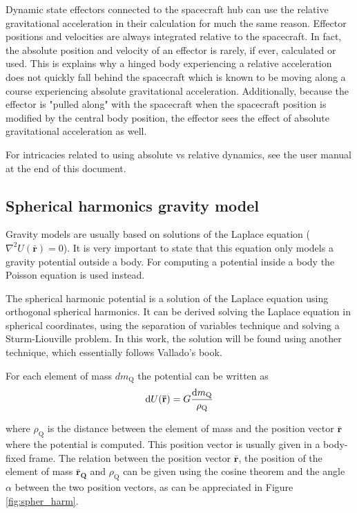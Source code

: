 Dynamic state effectors connected to the spacecraft hub can use the relative gravitational acceleration in their calculation for much the same reason. Effector positions and velocities are always integrated relative to the spacecraft. In fact, the absolute position and velocity of an effector is rarely, if ever, calculated or used. This is explains why a hinged body experiencing a relative acceleration does not quickly fall behind the spacecraft which is known to be moving along a course experiencing absolute gravitational acceleration. Additionally, because the effector is "pulled along" with the spacecraft when the spacecraft position is modified by the central body position, the effector sees the effect of absolute gravitational acceleration as well.

For intricacies related to using absolute vs relative dynamics, see the user manual at the end of this document.

\subsection{Spherical harmonics gravity model}

Gravity models are usually based on solutions of the Laplace equation ($\nabla^2 U(\mathbf{\bar r}) = 0$). It is very important to state that this equation only models a gravity potential outside a body. For computing a potential inside a body the Poisson equation is used instead.

The spherical harmonic potential is a solution of the Laplace equation using orthogonal spherical harmonics. It can be derived solving the Laplace equation in spherical coordinates, using the separation of variables technique and solving a Sturm-Liouville problem. In this work, the solution will be found using another technique, which essentially follows Vallado's book\cite{vallado2013}.

For each element of mass $d m_\text{Q}$ the potential can be written as
\begin{equation}
\D U(\mathbf{\bar r}) = G \frac{\D m_\text{Q}}{\rho_\text{Q}}
\end{equation}

where $\rho_\text{Q}$ is the distance between the element of mass and the position vector $\mathbf{\bar r}$ where the potential is computed. This position vector is usually given in a body-fixed frame. The relation between the position vector $\mathbf{\bar r}$, the position of the element of mass $\mathbf{\bar r_\text{Q}}$ and $\rho_\text{Q}$ can be given using the cosine theorem and the angle $\alpha$ between the two position vectors, as can be appreciated in Figure \ref{fig:spher_harm}.

